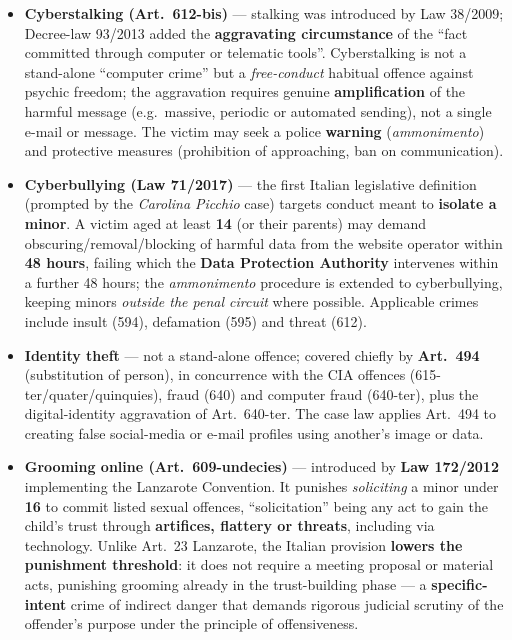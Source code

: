 \documentclass[11pt,a4paper,openany]{report}
\theoremstyle{definition}
\theoremstyle{plain}
\theoremstyle{remark}
\begin{document}
\begin{itemize}
    \item \textbf{Cyberstalking (Art.\ 612-bis)} --- stalking was introduced by Law 38/2009; Decree-law 93/2013 added the \textbf{aggravating circumstance} of the ``fact committed through computer or telematic tools''. Cyberstalking is not a stand-alone ``computer crime'' but a \emph{free-conduct} habitual offence against psychic freedom; the aggravation requires genuine \textbf{amplification} of the harmful message (e.g.\ massive, periodic or automated sending), not a single e-mail or message. The victim may seek a police \textbf{warning} (\emph{ammonimento}) and protective measures (prohibition of approaching, ban on communication).
    \item \textbf{Cyberbullying (Law 71/2017)} --- the first Italian legislative definition (prompted by the \emph{Carolina Picchio} case) targets conduct meant to \textbf{isolate a minor}. A victim aged at least \textbf{14} (or their parents) may demand obscuring/removal/blocking of harmful data from the website operator within \textbf{48 hours}, failing which the \textbf{Data Protection Authority} intervenes within a further 48 hours; the \emph{ammonimento} procedure is extended to cyberbullying, keeping minors \emph{outside the penal circuit} where possible. Applicable crimes include insult (594), defamation (595) and threat (612).
    \item \textbf{Identity theft} --- not a stand-alone offence; covered chiefly by \textbf{Art.\ 494} (substitution of person), in concurrence with the CIA offences (615-ter/quater/quinquies), fraud (640) and computer fraud (640-ter), plus the digital-identity aggravation of Art.\ 640-ter. The case law applies Art.\ 494 to creating false social-media or e-mail profiles using another's image or data.
    \item \textbf{Grooming online (Art.\ 609-undecies)} --- introduced by \textbf{Law 172/2012} implementing the Lanzarote Convention. It punishes \emph{soliciting} a minor under \textbf{16} to commit listed sexual offences, ``solicitation'' being any act to gain the child's trust through \textbf{artifices, flattery or threats}, including via technology. Unlike Art.\ 23 Lanzarote, the Italian provision \textbf{lowers the punishment threshold}: it does not require a meeting proposal or material acts, punishing grooming already in the trust-building phase --- a \textbf{specific-intent} crime of indirect danger that demands rigorous judicial scrutiny of the offender's purpose under the principle of offensiveness.
\end{itemize}
\end{document}
